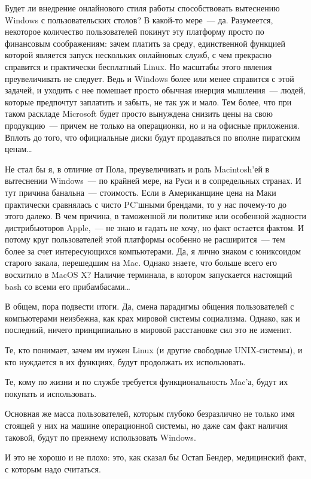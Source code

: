 Будет ли внедрение онлайнового стиля работы способствовать вытеснению Windows с пользовательских столов? В какой-то мере~--- да. Разумеется, некоторое количество пользователей покинут эту платформу просто по финансовым соображениям: зачем платить за среду, единственной функцией которой является запуск нескольких онлайновых служб, с чем прекрасно справится и практически бесплатный Linux. Но масштабы этого явления преувеличивать не следует. Ведь и Windows более или менее справится с этой задачей, и уходить с нее помешает просто обычная инерция мышления~--- людей, которые предпочтут заплатить и забыть, не так уж и мало. Тем более, что при таком раскладе Microsoft будет просто вынуждена снизить цены на свою продукцию~--- причем не только на операционки, но и на офисные приложения. Вплоть до того, что официальные диски будут продаваться по вполне пиратским ценам\dots

Не стал бы я, в отличие от Пола, преувеличивать и роль Macintosh'ей в вытеснении Windows~--- по крайней мере, на Руси и в сопредельных странах. И тут причина банальна~--- стоимость. Если в Американщине цена на Маки практически сравнялась с чисто PC'шными брендами, то у нас почему-то до этого далеко. В чем причина, в таможенной ли политике или особенной жадности дистрибьюторов Apple,~--- не знаю и гадать не хочу, но факт остается фактом. И потому круг пользователей этой платформы особенно не расширится~--- тем более за счет интересующихся компьютерами. Да, я лично знаком с юниксоидом старого закала, перешедшим на Mac. Однако знаете, что больше всего его восхитило в MacOS X? Наличие терминала, в котором запускается настоящий bash со всеми его прибамбасами\dots

В общем, пора подвести итоги. Да, смена парадигмы общения пользователей с компьютерами неизбежна, как крах мировой системы социализма. Однако, как и последний, ничего принципиально в мировой расстановке сил это не изменит.

Те, кто понимает, зачем им нужен Linux (и другие свободные UNIX-системы), и кто нуждается в их функциях, будут продолжать их использовать. 

Те, кому по жизни и по службе требуется функциональность Mac'а, будут их покупать и использовать.

Основная же масса пользователей, которым глубоко безразлично не только имя стоящей у них на машине операционной системы, но даже сам факт наличия таковой, будут по прежнему использовать Windows.

И это не хорошо и не плохо: это, как сказал бы Остап Бендер, медицинский факт, с которым надо считаться.

